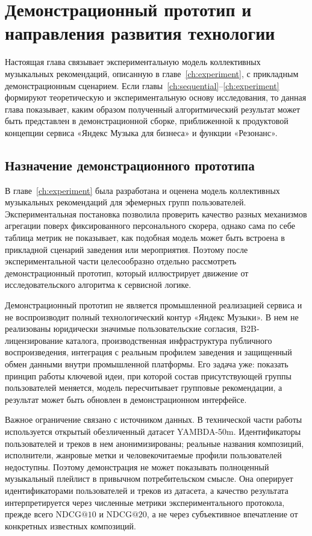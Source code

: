 \chapter{Демонстрационный прототип и направления развития технологии}
\label{ch:prototype}

Настоящая глава связывает экспериментальную модель коллективных музыкальных рекомендаций, описанную в главе~\ref{ch:experiment}, с прикладным демонстрационным сценарием. Если главы~\ref{ch:sequential}--\ref{ch:experiment} формируют теоретическую и экспериментальную основу исследования, то данная глава показывает, каким образом полученный алгоритмический результат может быть представлен в демонстрационной сборке, приближенной к продуктовой концепции сервиса «Яндекс Музыка для бизнеса» и функции «Резонанс».

\section{Назначение демонстрационного прототипа}
\label{sec:ch6:purpose}

В главе~\ref{ch:experiment} была разработана и оценена модель коллективных музыкальных рекомендаций для эфемерных групп пользователей. Экспериментальная постановка позволила проверить качество разных механизмов агрегации поверх фиксированного персонального скорера, однако сама по себе таблица метрик не показывает, как подобная модель может быть встроена в прикладной сценарий заведения или мероприятия. Поэтому после экспериментальной части целесообразно отдельно рассмотреть демонстрационный прототип, который иллюстрирует движение от исследовательского алгоритма к сервисной логике.

Демонстрационный прототип не является промышленной реализацией сервиса и не воспроизводит полный технологический контур «Яндекс Музыки». В нем не реализованы юридически значимые пользовательские согласия, B2B-лицензирование каталога, производственная инфраструктура публичного воспроизведения, интеграция с реальным профилем заведения и защищенный обмен данными внутри промышленной платформы. Его задача уже: показать принцип работы ключевой идеи, при которой состав присутствующей группы пользователей меняется, модель пересчитывает групповые рекомендации, а результат может быть обновлен в демонстрационном интерфейсе.

Важное ограничение связано с источником данных. В технической части работы используется открытый обезличенный датасет YAMBDA-50m. Идентификаторы пользователей и треков в нем анонимизированы; реальные названия композиций, исполнители, жанровые метки и человекочитаемые профили пользователей недоступны. Поэтому демонстрация не может показывать полноценный музыкальный плейлист в привычном потребительском смысле. Она оперирует идентификаторами пользователей и треков из датасета, а качество результата интерпретируется через численные метрики экспериментального протокола, прежде всего $\mathrm{NDCG@10}$ и $\mathrm{NDCG@20}$, а не через субъективное впечатление от конкретных известных композиций.

